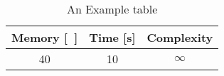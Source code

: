 \begin{table}[t]
	\centering
	\caption{An Example table}\label{tab:example}
	\begin{tabular}{ccc}
		\toprule
		Memory [\si{\mebi\byte}] & Time [\si{\second}] & Complexity \\
		\midrule
		40 & 10 & \(\infty\) \\
		\bottomrule
	\end{tabular}
\end{table}
